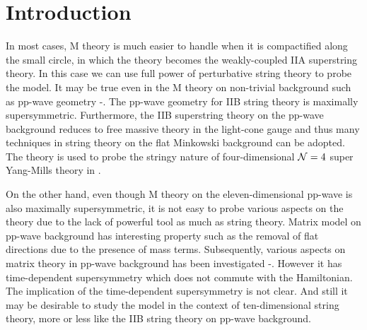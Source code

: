 \documentclass[a4paper,12pt]{article}
\begin{document}
\baselineskip 6.5mm
\renewcommand{\thefootnote}{\arabic{footnote}}
\setcounter{footnote}{0}


\section{Introduction}
In most cases, M theory is much easier to handle when it is
compactified along the small circle, in which the theory becomes the
weakly-coupled IIA superstring theory. In this case we can use full
power of perturbative string theory to probe the model. It may be true
even in the M theory on non-trivial background such as pp-wave
geometry \cite{kow194}-\cite{bla081}. The pp-wave geometry for IIB
string theory is maximally supersymmetric\cite{bla242}. Furthermore,
the IIB superstring theory on the pp-wave background reduces to free
massive theory in the light-cone gauge \cite{met044} and thus many
techniques in string theory on the flat Minkowski background can be
adopted.  The theory is used to probe the stringy nature of
four-dimensional ${\cal N}=4$ super Yang-Mills theory in
\cite{ber021}.

On the other hand, even though M theory on the eleven-dimensional
pp-wave is also maximally supersymmetric, it is not easy to probe
various aspects on the theory due to the lack of powerful tool as much
as string theory. Matrix model on pp-wave background
\cite{ber021,das185} has interesting property such as the removal of
flat directions due to the presence of mass terms. Subsequently,
various aspects on matrix theory in pp-wave background has been
investigated \cite{hyu090}-\cite{sug070}.  However it has
time-dependent supersymmetry which does not commute with the
Hamiltonian.  The implication of the time-dependent supersymmetry is
not clear. And still it may be desirable to study the model in the
context of ten-dimensional string theory, more or less like the IIB
string theory on pp-wave background.
\end{document}
